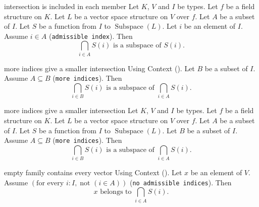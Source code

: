 \else
\begin{cleanresult}{intersection is included in each member}
Let $K$, $V$ and $I$ be types.
Let $f$ be a field structure on $K$.
Let $L$ be a vector space structure on $V$ over $f$.
Let $A$ be a subset of $I$.
Let $S$ be a function from $I$ to $\operatorname{Subspace}(L)$.
Let $i$ be an element of $I$.
Assume $i\in A$ (\texttt{admissible index}).
Then \[\bigcap_{i \in A} S(i)\text{ is a subspace of }S(i).\]
\par{}
\end{cleanresult}

\fi
\ifcleanreferenced
\begin{cleanresult}{more indices give a smaller intersection}
Using Context ().
Let $B$ be a subset of $I$.
Assume $A\subseteq B$ (\texttt{more indices}).
Then \[\bigcap_{i \in B} S(i)\text{ is a subspace of }\bigcap_{i \in A} S(i).\]
\par{}
\end{cleanresult}

\else
\begin{cleanresult}{more indices give a smaller intersection}
Let $K$, $V$ and $I$ be types.
Let $f$ be a field structure on $K$.
Let $L$ be a vector space structure on $V$ over $f$.
Let $A$ be a subset of $I$.
Let $S$ be a function from $I$ to $\operatorname{Subspace}(L)$.
Let $B$ be a subset of $I$.
Assume $A\subseteq B$ (\texttt{more indices}).
Then \[\bigcap_{i \in B} S(i)\text{ is a subspace of }\bigcap_{i \in A} S(i).\]
\par{}
\end{cleanresult}

\fi
\ifcleanreferenced
\begin{cleanresult}{empty family contains every vector}
Using Context ().
Let $x$ be an element of $V$.
Assume $\left(\text{for every }i : I,\; \text{not }\left(i\in A\right)\right)$ (\texttt{no admissible indices}).
Then \[x\text{ belongs to }\bigcap_{i \in A} S(i).\]
\par{}
\end{cleanresult}

